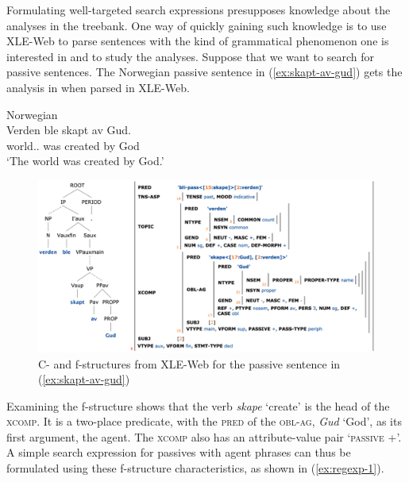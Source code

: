 \documentclass[output=paper,hidelinks]{langscibook}
\begin{document}
Formulating %
well-targeted search expressions presupposes knowledge about the analyses in the treebank.
One way of quickly gaining such knowledge is to use XLE-Web to parse sentences with the kind of grammatical phenomenon one is interested in and to study the analyses.
Suppose that we want to search for passive sentences.
The Norwegian passive sentence in (\ref{ex:skapt-av-gud}) gets the analysis in  when parsed in XLE-Web.

\ea Norwegian\\
\gll Verden ble skapt av Gud.\\  
     {world.\DEF.\SG} was created by God\\ 
\glt `The world was created by God.'
\label{ex:skapt-av-gud}
\z

\begin{figure}
    \includegraphics[width=\textwidth]{figures/Treebanks/skapt-av-gud2.png}
    \caption{C- and f-structures from XLE-Web for the passive sentence in (\ref{ex:skapt-av-gud})  }
    \label{fig:skapt-av-gud}
\end{figure}

Examining the f-structure shows that the verb \textit{skape} `create' is the head of the \textsc{xcomp}.
It is a two-place predicate, with the \textsc{pred} of the \textsc{obl-ag}, \textit{Gud} `God', as its first argument, the agent.
The \textsc{xcomp} also has an attribute-value pair `\textsc{passive} +'.
A simple search expression for passives with agent phrases can thus be formulated using these f-structure characteristics, as shown in (\ref{ex:regexp-1}).
\end{document}
